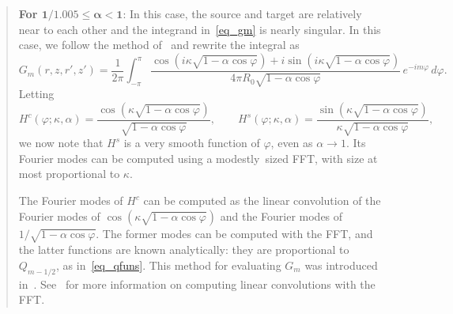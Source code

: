 \documentclass[11pt]{article}
\renewcommand{\phi}{\varphi}
\numberwithin{equation}{section}
\begin{document}
\begin{quote}
\textbf{For $\bm{1/1.005 \leq \alpha < 1 }$}: In this case, the source
and target are relatively near to each other and the integrand
in~\eqref{eq_gm} is nearly singular. In this case, we follow the
method of~\cite{helsing_2014} and rewrite the integral as
\[
G_m(r,z,r',z') = \frac{1}{2\pi} \int_{-\pi}^\pi 
\frac{\cos(i\kappa \sqrt{1 - \alpha\cos\phi }) 
+ i \sin(i\kappa \sqrt{1 - \alpha\cos\phi })}
{4\pi R_0 \sqrt{1-\alpha\cos\phi}}
\, e^{-im\phi} \, d\phi.
\]
Letting
\[
H^c(\phi; \kappa,\alpha) = \frac{\cos(\kappa \sqrt{1 - \alpha\cos\phi }) }
{ \sqrt{1-\alpha\cos\phi}}, \qquad
H^s(\phi; \kappa,\alpha) = \frac{\sin(\kappa \sqrt{1 - \alpha\cos\phi }) }
{ \kappa \sqrt{1-\alpha\cos\phi}},
\]
we now note that $H^s$ is a very smooth function of $\phi$, even as
$\alpha \to 1$. Its Fourier modes can be computed using a
modestly~sized FFT, with size at most proportional to $\kappa$.

The Fourier modes of $H^c$ can be computed as the linear convolution
of the Fourier modes of $\cos(\kappa \sqrt{1 - \alpha\cos\phi }) $ and
the Fourier modes of $1/\sqrt{1-\alpha\cos\phi}$. The former modes can
be computed with the FFT, and the latter functions are known
analytically: they are proportional to $Q_{m-1/2}$, as
in~\eqref{eq_qfuns}. This method for evaluating $G_m$ was introduced
in~\cite{young}. See~\cite{briggs_1995} for more information on computing
linear convolutions with the FFT.
\end{quote}
\end{document}

